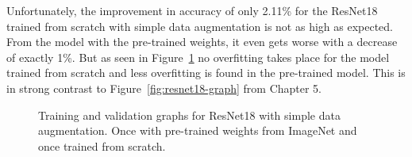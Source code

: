 \begin{table}[!h] \centering
{}
\caption{Cropping, resizing and  random flipping performed on the ResNet18 architecture with and without transfer learning. The first row is a run with the original configuration without any randomness or cropping and serves as comparison.}
\label{tbl:ResNet18_cropping}
\end{table}

Unfortunately, the improvement in accuracy of only 2.11\% for the ResNet18 trained from scratch with simple data augmentation is not as high as expected. From the model with the pre-trained weights, it even gets worse with a decrease of exactly 1\%. But as seen in Figure~\ref{fig:resnet18-da-graph} no overfitting takes place for the model trained from scratch and less overfitting is found in the pre-trained model. This is in strong contrast to Figure~\ref{fig:resnet18-graph} from Chapter 5.

\begin{figure}[!h]
\centering
\caption{Training and validation graphs for ResNet18 with simple data augmentation. Once with pre-trained weights from ImageNet and once trained from scratch.}
\label{fig:resnet18-da-graph}
\end{figure}

